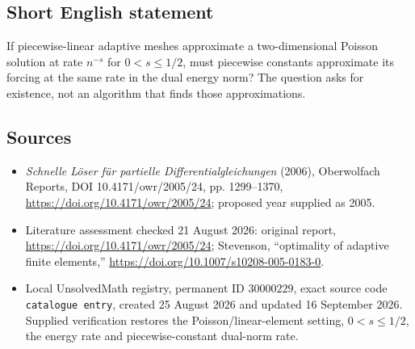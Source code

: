 \documentclass[11pt]{article}
\begin{document}
\subsection{Short English statement}
If piecewise-linear adaptive meshes approximate a two-dimensional Poisson solution at rate $n^{-s}$ for $0<s\le1/2$, must piecewise constants approximate its forcing at the same rate in the dual energy norm? The question asks for existence, not an algorithm that finds those approximations.
\subsection{Sources}
\begin{itemize}
\item \emph{Schnelle L\"oser f\"ur partielle Differentialgleichungen} (2006), Oberwolfach Reports, DOI 10.4171/owr/2005/24, pp. 1299--1370, \url{https://doi.org/10.4171/owr/2005/24}; proposed year supplied as 2005.
\item Literature assessment checked 21 August 2026: original report, \url{https://doi.org/10.4171/owr/2005/24}; Stevenson, ``optimality of adaptive finite elements,'' \url{https://doi.org/10.1007/s10208-005-0183-0}.
\item Local UnsolvedMath registry, permanent ID $30000229$, exact source code \texttt{catalogue entry}, created 25 August 2026 and updated 16 September 2026. Supplied verification restores the Poisson/linear-element setting, $0<s\le1/2$, the energy rate and piecewise-constant dual-norm rate.
\end{itemize}
\end{document}
